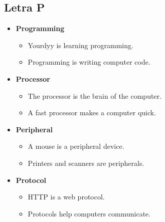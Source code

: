     \subsection{Letra P}
    \begin{itemize}
        \item \textbf{Programming}
        \begin{itemize}
            \item Yourdyy is learning programming.
            \item Programming is writing computer code.
        \end{itemize}
        \item \textbf{Processor}
        \begin{itemize}
            \item The processor is the brain of the computer.
            \item A fast processor makes a computer quick.
        \end{itemize}
        \item \textbf{Peripheral}
        \begin{itemize}
            \item A mouse is a peripheral device.
            \item Printers and scanners are peripherals.
        \end{itemize}
        \item \textbf{Protocol}
        \begin{itemize}
            \item HTTP is a web protocol.
            \item Protocols help computers communicate.
        \end{itemize}
    \end{itemize}
